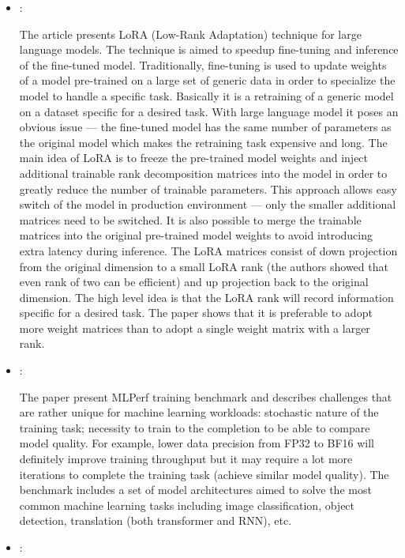 \begin{itemize}
    \item \cite{Hu:LoRA:2021}:

    The article presents LoRA (Low-Rank Adaptation) technique for large language models. The technique is aimed to speedup fine-tuning and inference of the fine-tuned model. Traditionally, fine-tuning is used to update weights of a model pre-trained on a large set of generic data in order to specialize the model to handle a specific task. Basically it is a retraining of a generic model on a dataset specific for a desired task. With large language model it poses an obvious issue --- the fine-tuned model has the same number of parameters as the original model which makes the retraining task expensive and long. The main idea of LoRA is to freeze the pre-trained model weights and inject additional trainable rank decomposition matrices into the model in order to greatly reduce the number of trainable parameters. This approach allows easy switch of the model in production environment --- only the smaller additional matrices need to be switched. It is also possible to merge the trainable matrices into the original pre-trained model weights to avoid introducing extra latency during inference. The LoRA matrices consist of down projection from the original dimension to a small LoRA rank (the authors showed that even rank of two can be efficient) and up projection back to the original dimension. The high level idea is that the LoRA rank will record information specific for a desired task. The paper shows that it is preferable to adopt more weight matrices than to adopt a single weight matrix with a larger rank.

    \item \cite{Mattson:MLPerfTraining:2020}:

    The paper present MLPerf training benchmark and describes challenges that are rather unique for machine learning workloads: stochastic nature of the training task; necessity to train to the completion to be able to compare model quality. For example, lower data precision from FP32 to BF16 will definitely improve training throughput but it may require a lot more iterations to complete the training task (achieve similar model quality). The benchmark includes a set of model architectures aimed to solve the most common machine learning tasks including image classification, object detection, translation (both transformer and RNN), etc.

    \item \cite{Korthikanti:SequenceParallel:2022}:


\end{itemize}
